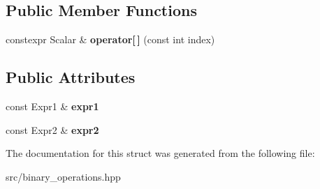 \subsection*{Public Member Functions}
\begin{DoxyCompactItemize}
\item 
\mbox{\label{structBinaryOp_abe24eb2101260539e40e079163658c18}} 
constexpr Scalar \& {\bfseries operator\mbox{[}$\,$\mbox{]}} (const int index)
\end{DoxyCompactItemize}
\subsection*{Public Attributes}
\begin{DoxyCompactItemize}
\item 
\mbox{\label{structBinaryOp_a149d1150d0ddde47299bcf55a79b17bd}} 
const Expr1 \& {\bfseries expr1}
\item 
\mbox{\label{structBinaryOp_a2719a5e3c601f4048019b34cb011c6c1}} 
const Expr2 \& {\bfseries expr2}
\end{DoxyCompactItemize}


The documentation for this struct was generated from the following file\+:\begin{DoxyCompactItemize}
\item 
src/binary\+\_\+operations.\+hpp\end{DoxyCompactItemize}
